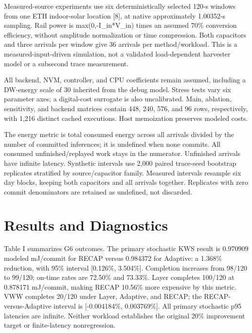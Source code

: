 \documentclass[journal,10pt]{IEEEtran}
\begin{document}
Measured-source experiments use six deterministically selected 120-s windows from one ETH indoor-solar location [8], at native approximately 1.00352-s sampling. Rail power is max(0,-I\_in*V\_in) times an assumed 70\% conversion efficiency, without amplitude normalization or time compression. Both capacitors and three arrivals per window give 36 arrivals per method/workload. This is a measured-input-driven simulation, not a validated load-dependent harvester model or a subsecond trace measurement.

All backend, NVM, controller, and CPU coefficients remain assumed, including a DW-energy scale of 30 inherited from the debug model. Stress tests vary six parameter axes; a digital-cost surrogate is also uncalibrated. Main, ablation, sensitivity, and backend matrices contain 448, 240, 576, and 96 rows, respectively, with 1,216 distinct cached executions. Host memoization preserves modeled costs.

The energy metric is total consumed energy across all arrivals divided by the number of committed inferences; it is undefined when none commits. All consumed unfinished/replayed work stays in the numerator. Unfinished arrivals have infinite latency. Synthetic intervals use 2,000 paired trace-seed bootstrap replicates stratified by source/capacitor family. Measured intervals resample six day blocks, keeping both capacitors and all arrivals together. Replicates with zero commit denominators are retained as undefined, not discarded.

\section{Results and Diagnostics}

Table I summarizes G6 outcomes. The primary stochastic KWS result is 0.970909 modeled mJ/commit for RECAP versus 0.984372 for Adaptive: a 1.368\% reduction, with 95\% interval [0.126\%, 3.504\%]. Completion increases from 98/120 to 99/120; on-time rates are 72.50\% and 73.33\%. Layer completes 100/120 at 0.878171 mJ/commit, making RECAP 10.56\% more expensive by this metric. VWW completes 20/120 under Layer, Adaptive, and RECAP; the RECAP-versus-Adaptive interval is [-0.004184\%, 0.003769\%]. All primary stochastic p95 latencies are infinite. Neither workload establishes the original 20\% improvement target or finite-latency nonregression.
\end{document}

